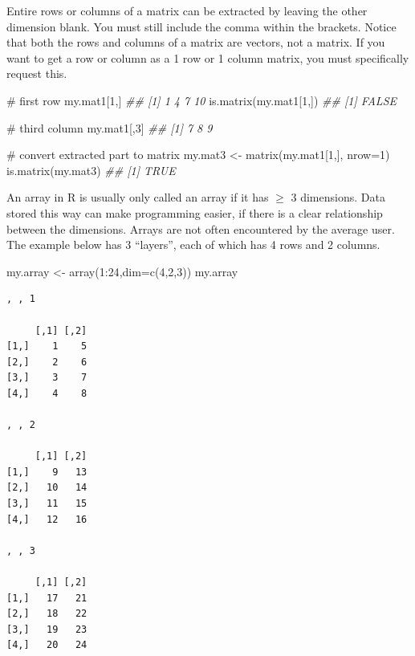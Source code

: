 \documentclass[
  13,
  letterpaper,
]{report}
\newenvironment{Shaded}{\begin{snugshade}}{\end{snugshade}}
\newcommand{\AttributeTok}[1]{\textcolor[rgb]{0.40,0.45,0.13}{#1}}
\newcommand{\CommentTok}[1]{\textcolor[rgb]{0.37,0.37,0.37}{#1}}
\newcommand{\DecValTok}[1]{\textcolor[rgb]{0.68,0.00,0.00}{#1}}
\newcommand{\DocumentationTok}[1]{\textcolor[rgb]{0.37,0.37,0.37}{\textit{#1}}}
\newcommand{\FunctionTok}[1]{\textcolor[rgb]{0.28,0.35,0.67}{#1}}
\newcommand{\NormalTok}[1]{\textcolor[rgb]{0.00,0.23,0.31}{#1}}
\newcommand{\OtherTok}[1]{\textcolor[rgb]{0.00,0.23,0.31}{#1}}
\newcommand{\SpecialCharTok}[1]{\textcolor[rgb]{0.37,0.37,0.37}{#1}}
\begin{document}
Entire rows or columns of a matrix can be extracted by leaving the other
dimension blank. You must still include the comma within the brackets.
Notice that both the rows and columns of a matrix are vectors, not a
matrix. If you want to get a row or column as a 1 row or 1 column
matrix, you must specifically request this.

\begin{Shaded}
\begin{Highlighting}[]
\CommentTok{\# first row}
\NormalTok{my.mat1[}\DecValTok{1}\NormalTok{,]}
\DocumentationTok{\#\# [1]  1  4  7 10}
\FunctionTok{is.matrix}\NormalTok{(my.mat1[}\DecValTok{1}\NormalTok{,])}
\DocumentationTok{\#\# [1] FALSE}

\CommentTok{\# third column}
\NormalTok{my.mat1[,}\DecValTok{3}\NormalTok{]}
\DocumentationTok{\#\# [1] 7 8 9}

\CommentTok{\# convert extracted part to matrix}
\NormalTok{my.mat3 }\OtherTok{\textless{}{-}} \FunctionTok{matrix}\NormalTok{(my.mat1[}\DecValTok{1}\NormalTok{,], }\AttributeTok{nrow=}\DecValTok{1}\NormalTok{)}
\FunctionTok{is.matrix}\NormalTok{(my.mat3)}
\DocumentationTok{\#\# [1] TRUE}
\end{Highlighting}
\end{Shaded}

An array in R is usually only called an array if it has \(\ge\) 3
dimensions. Data stored this way can make programming easier, if there
is a clear relationship between the dimensions. Arrays are not often
encountered by the average user. The example below has 3 ``layers'',
each of which has 4 rows and 2 columns.

\begin{Shaded}
\begin{Highlighting}[]
\NormalTok{my.array }\OtherTok{\textless{}{-}} \FunctionTok{array}\NormalTok{(}\DecValTok{1}\SpecialCharTok{:}\DecValTok{24}\NormalTok{,}\AttributeTok{dim=}\FunctionTok{c}\NormalTok{(}\DecValTok{4}\NormalTok{,}\DecValTok{2}\NormalTok{,}\DecValTok{3}\NormalTok{))}
\NormalTok{my.array}
\end{Highlighting}
\end{Shaded}

\begin{verbatim}
, , 1

     [,1] [,2]
[1,]    1    5
[2,]    2    6
[3,]    3    7
[4,]    4    8

, , 2

     [,1] [,2]
[1,]    9   13
[2,]   10   14
[3,]   11   15
[4,]   12   16

, , 3

     [,1] [,2]
[1,]   17   21
[2,]   18   22
[3,]   19   23
[4,]   20   24
\end{verbatim}
\end{document}
